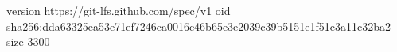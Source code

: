 version https://git-lfs.github.com/spec/v1
oid sha256:dda63325ea53e71ef7246ca0016c46b65e3e2039c39b5151e1f51c3a11c32ba2
size 3300
